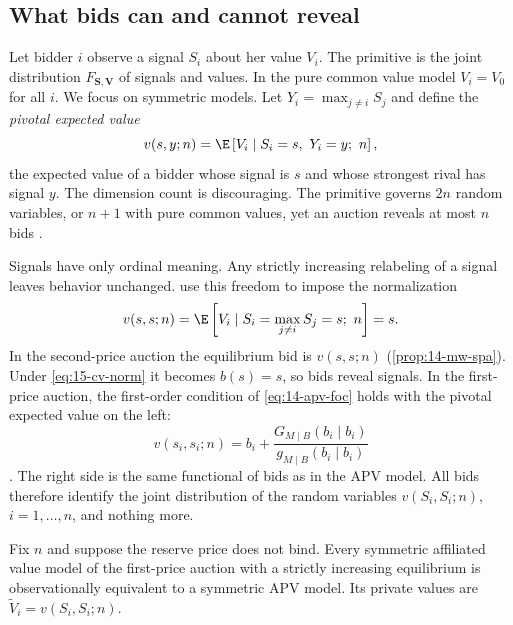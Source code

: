 \subsection{What bids can and cannot reveal}\label{sec:15-cv-limits}

Let bidder $i$ observe a signal $S_i$ about her value $V_i$. The primitive is the joint distribution
$F_{\bm S,\bm V}$ of signals and values. In the pure common value model $V_i=V_0$ for all $i$. We focus on
symmetric models. Let $Y_i=\max_{j\ne i}S_j$ and define the \emph{pivotal expected value}
\begin{equation*}
  v(s,y;n)=\E\left[V_i\mid S_i=s,\ Y_i=y;\ n\right],
\end{equation*}
the expected value of a bidder whose signal is $s$ and whose strongest rival has signal $y$. The dimension
count is discouraging. The primitive governs $2n$ random variables, or $n+1$ with pure common values, yet an
auction reveals at most $n$ bids \citep[Section~7.1]{AtheyHaile2007}.

Signals have only ordinal meaning. Any strictly increasing relabeling of a signal leaves behavior unchanged.
\citet[eq.~(8)]{AtheyHaile2002} use this freedom to impose the normalization
\begin{equation}\label{eq:15-cv-norm}
  v(s,s;n)=\E\left[V_i\mid S_i=\max_{j\ne i}S_j=s;\ n\right]=s .
\end{equation}
In the second-price auction the equilibrium bid is $v(s,s;n)$ (\cref{prop:14-mw-spa}). Under
\eqref{eq:15-cv-norm} it becomes $b(s)=s$, so bids reveal signals. In the first-price auction, the
first-order condition of \eqref{eq:14-apv-foc} holds with the pivotal expected value on the left:
\begin{equation}\label{eq:15-cv-foc}
  v(s_i,s_i;n)=b_i+\frac{G_{M\mid B}(b_i\mid b_i)}{g_{M\mid B}(b_i\mid b_i)}
\end{equation}
\citep[eq.~(7.2)]{AtheyHaile2007}. The right side is the same functional of bids as in the APV model. All
bids therefore identify the joint distribution of the random variables $v(S_i,S_i;n)$, $i=1,\dots,n$, and
nothing more.

\begin{proposition}\label{prop:15-lv}
Fix $n$ and suppose the reserve price does not bind. Every symmetric affiliated value model of the
first-price auction with a strictly increasing equilibrium is observationally equivalent to a symmetric APV
model. Its private values are $\tilde V_i=v(S_i,S_i;n)$.
\end{proposition}


